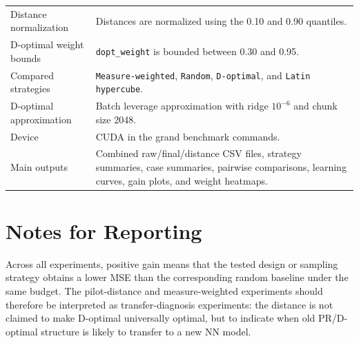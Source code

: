 \documentclass[UTF8,a4paper,11pt]{ctexart}
\begin{document}
\begin{longtable}{L{0.30\textwidth}L{0.58\textwidth}}
Distance normalization
& Distances are normalized using the 0.10 and 0.90 quantiles. \\

D-optimal weight bounds
& \texttt{dopt\_weight} is bounded between 0.30 and 0.95. \\

Compared strategies
& \texttt{Measure-weighted}, \texttt{Random}, \texttt{D-optimal}, and \texttt{Latin hypercube}. \\

D-optimal approximation
& Batch leverage approximation with ridge $10^{-6}$ and chunk size 2048. \\

Device
& CUDA in the grand benchmark commands. \\

Main outputs
& Combined raw/final/distance CSV files, strategy summaries, case summaries, pairwise comparisons, learning curves, gain plots, and weight heatmaps. \\

\end{longtable}

\section{Notes for Reporting}

Across all experiments, positive gain means that the tested design or sampling strategy obtains a lower MSE than the corresponding random baseline under the same budget. The pilot-distance and measure-weighted experiments should therefore be interpreted as transfer-diagnosis experiments: the distance is not claimed to make D-optimal universally optimal, but to indicate when old PR/D-optimal structure is likely to transfer to a new NN model.
\end{document}
